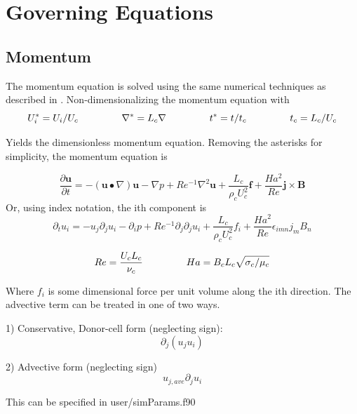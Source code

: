 \section{Governing Equations}

\subsection{Momentum}
The momentum equation is solved using the same numerical techniques as described in \cite{griebel1997numerical}.
Non-dimensionalizing the momentum equation with
\begin{equation*}
U_i^* = U_i/U_c  \;\;\;\;\;\;\;\;\;\;\;\;\;\;\;\;
\nabla^* = L_c \nabla \;\;\;\;\;\;\;\;\;\;\;\;\;\;\;\;
t^* = t/t_c  \;\;\;\;\;\;\;\;\;\;\;\;\;\;\;\;
t_c = L_c/U_c
\end{equation*}

Yields the dimensionless momentum equation. Removing the asterisks for simplicity, the momentum equation is

\begin{equation} \label{eq:momentum}
\frac{\partial \pmb{u}}{\partial t} = 
- ( \pmb{u} \bullet \nabla ) \pmb{u}
- \nabla p
+ Re^{-1} \nabla^2 \pmb{u} 
+ \frac{L_c}{\rho_c U_c^2} \pmb{f}
+ \frac{Ha^2}{Re} \pmb{j} \times \pmb{B}
\end{equation}
Or, using index notation, the ith component is
\begin{equation} \label{eq:momentumIndex}
\partial_t u_i = 
- u_j \partial_j u_i 
- \partial_i p 
+ Re^{-1} \partial_j \partial_j u_i 
+ \frac{L_c}{\rho_c U_c^2} f_i
+ \frac{Ha^2}{Re} \epsilon_{imn} j_m B_n
\end{equation}

\begin{equation} \label{eq:Re}
Re = \frac{U_c L_c}{\nu_c}
\;\;\;\;\;\;\;\;\;\;\;\;\;\;\;\;
Ha = B_c L_c \sqrt{\sigma_c/\mu_c}
\end{equation}

Where $f_i$ is some dimensional force per unit volume along the ith direction. The advective term can be treated in one of two ways.

1) Conservative, Donor-cell form (neglecting sign):
\begin{equation} \label{eq:Donor-Cell}
\partial_j (u_j u_i)
\end{equation}

2) Advective form (neglecting sign)
\begin{equation} \label{eq:advectiveUForm}
u_{j,ave} \partial_j u_i
\end{equation}

This can be specified in user/simParams.f90

